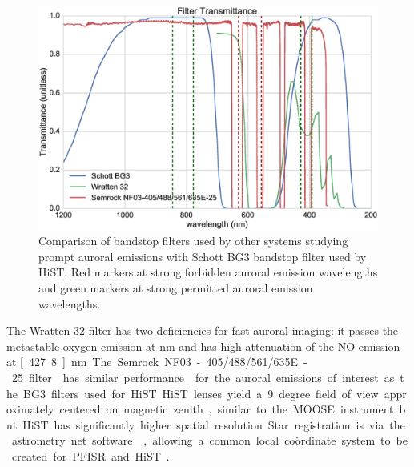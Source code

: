 \begin{figure}\centering
    \includegraphics[width=0.9\columnwidth]{gfx/filterT}
    \caption{Comparison of bandstop filters used by other systems studying prompt auroral emissions with Schott BG3 bandstop filter used by HiST. Red markers at strong forbidden auroral emission wavelengths and green markers at strong permitted auroral emission wavelengths.}\label{fig:filters}
\end{figure}
The Wratten 32 filter \citep{wratten} has two deficiencies for fast auroral imaging: it passes the metastable oxygen emission at \unit[630]{nm} and has high attenuation of the NO emission at \unit[427.8]{nm}.
The Semrock NF03-405/488/561/635E-25 filter \citep{semrock} has similar performance \citep{jackel2014} for the auroral emissions of interest as the BG3 filters used for HiST.
HiST lenses yield a 9 degree field of view approximately centered on magnetic zenith, similar to the MOOSE instrument but HiST has significantly higher spatial resolution.
Star registration is via the astrometry.net software \citep{lang2010,hirschastro}, allowing a common local coördinate system to be created for PFISR and HiST \citep{geodata}.


